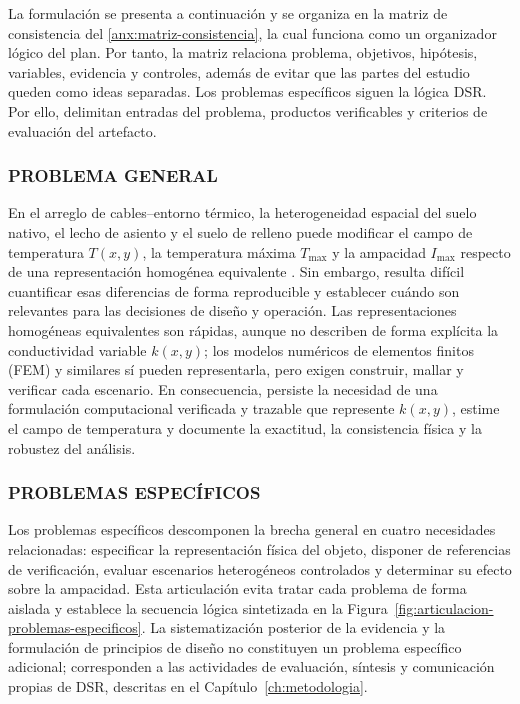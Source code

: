 \documentclass[11pt,a4paper,oneside]{report}
\newcommand{\Tmax}{T_{\max}}
\newcommand{\Imax}{I_{\max}}
\newcommand{\kx}{k(x,y)}
\begin{document}
La formulación se presenta a continuación y se organiza en la matriz de consistencia del \ref{anx:matriz-consistencia}, la cual funciona como un organizador lógico del plan. Por tanto, la matriz relaciona problema, objetivos, hipótesis, variables, evidencia y controles, además de evitar que las partes del estudio queden como ideas separadas. Los problemas específicos siguen la lógica DSR. Por ello, delimitan entradas del problema, productos verificables y criterios de evaluación del artefacto.

\subsubsection{PROBLEMA GENERAL}

En el arreglo de cables--entorno térmico, la heterogeneidad espacial del suelo nativo, el lecho de asiento y el suelo de relleno puede modificar el campo de temperatura $T(x,y)$, la temperatura máxima $\Tmax$ y la ampacidad $\Imax$ respecto de una representación homogénea equivalente \parencites[4--6]{enescu2021}[3--4,93--99]{cigre2025}. Sin embargo, resulta difícil cuantificar esas diferencias de forma reproducible y establecer cuándo son relevantes para las decisiones de diseño y operación. Las representaciones homogéneas equivalentes son rápidas, aunque no describen de forma explícita la conductividad variable $\kx$; los modelos numéricos de elementos finitos (FEM) y similares sí pueden representarla, pero exigen construir, mallar y verificar cada escenario. En consecuencia, persiste la necesidad de una formulación computacional verificada y trazable que represente $\kx$, estime el campo de temperatura y documente la exactitud, la consistencia física y la robustez del análisis.

\subsubsection{PROBLEMAS ESPECÍFICOS}

Los problemas específicos descomponen la brecha general en cuatro necesidades relacionadas: especificar la representación física del objeto, disponer de referencias de verificación, evaluar escenarios heterogéneos controlados y determinar su efecto sobre la ampacidad. Esta articulación evita tratar cada problema de forma aislada y establece la secuencia lógica sintetizada en la Figura~\ref{fig:articulacion-problemas-especificos}. La sistematización posterior de la evidencia y la formulación de principios de diseño no constituyen un problema específico adicional; corresponden a las actividades de evaluación, síntesis y comunicación propias de DSR, descritas en el Capítulo~\ref{ch:metodologia}.
\end{document}
